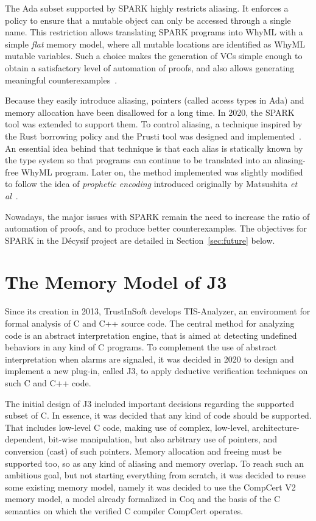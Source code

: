 \documentclass[a4paper,11pt]{article}
\begin{document}
The Ada subset supported by SPARK highly restricts aliasing. It enforces a policy
to ensure that a mutable object can only be accessed through a single name.
This restriction allows translating SPARK programs into WhyML with a simple
\emph{flat} memory model, where all mutable locations are identified as WhyML
mutable variables. Such a choice makes the generation of VCs simple enough to
obtain a satisfactory level of automation of proofs, and also allows generating
meaningful counterexamples~\cite{dailler18jlamp}.

Because they easily introduce aliasing, pointers (called access types in Ada)
and memory allocation have been disallowed for a long time. In 2020, the
SPARK tool was extended to support them. To control aliasing,
a technique inspired by the Rust borrowing policy and the Prusti tool was
designed and implemented~\cite{dross20cav,jaloyan20icfem}. An essential idea
behind that technique is that each alias is statically known by the type
system so that programs can continue to be translated into an aliasing-free
WhyML program. Later on, the method implemented was slightly modified to follow
the idea of \emph{prophetic encoding} introduced originally by Matsushita \emph{et
al}~\cite{matsushita20esop}.

Nowadays, the major issues with SPARK remain the need to increase the ratio of
automation of proofs, and to produce better counterexamples. The objectives for
SPARK in the Décysif project are detailed in Section~\ref{sec:future} below.

\section{The Memory Model of J3}
\label{sec:j3}

Since its creation in 2013, TrustInSoft develops TIS-Analyzer, an environment
for formal analysis of C and C++ source code. The central method for analyzing
code is an abstract interpretation engine, that is aimed at detecting undefined
behaviors in any kind of C programs. To complement the use of abstract
interpretation when alarms are signaled, it was decided in 2020 to design and implement
a new plug-in, called J3, to apply deductive verification techniques on such C
and C++ code.

The initial design of J3 included important decisions regarding the supported
subset of C. In essence, it was decided that any kind of code should be
supported. That includes low-level C code, making use of complex, low-level,
architecture-dependent, bit-wise manipulation, but also arbitrary use of
pointers, and conversion (cast) of such pointers. Memory allocation and freeing
must be supported too, so as any kind of aliasing and memory overlap. To reach
such an ambitious goal, but not starting everything from scratch, it was decided
to reuse some existing memory model, namely it was decided to use the CompCert
V2~\cite{leroy12rr} memory model, a model already formalized in Coq and the basis of
the C semantics on which the verified C compiler CompCert operates.
\end{document}

